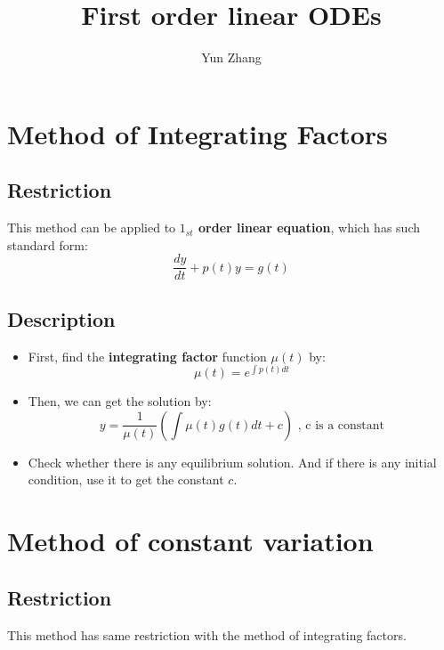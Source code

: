 \documentclass{article}
\title{First order linear ODEs}
\author{Yun Zhang}
\date{}
\begin{document}
\maketitle
\section{Method of Integrating Factors}
\subsection{Restriction}
This method can be applied to \textbf{$1_{st}$ order linear equation}, which has such standard form:
\begin{equation}
	\frac{dy}{dt}+p(t)y = g(t) 
\end{equation}
\subsection{Description}
\begin{itemize}
	\item First, find the \textbf{integrating factor} function $\mu(t)$ by:
	\begin{equation}
			 \mu(t) = e^{\int{p(t)dt}} 
	\end{equation}
	\item Then, we can get the solution by: 
	\begin{equation}
		y = \frac{1}{\mu(t)}(\int \mu(t)g(t)dt+c)\text{ , c is a constant}
	\end{equation}
	\item Check whether there is any equilibrium solution. And if there is any initial condition, use it to get the constant $c$.
\end{itemize}

\section{Method of constant variation}
\subsection{Restriction}
This method has same restriction with the method of integrating factors.
\end{document}
